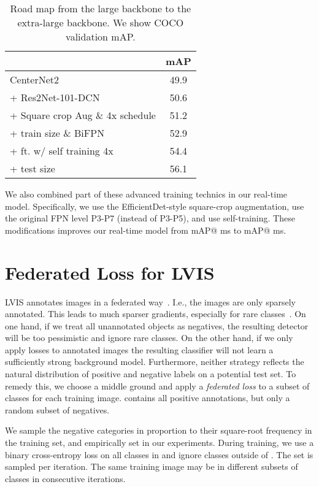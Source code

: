 \documentclass{article}
\begin{document}
\begin{table}[!t]
\centering
\begin{tabular}{l@{\ \ \ \ \ \ }c}
\toprule
 & mAP \\
\midrule
CenterNet2 & 49.9 \\
+ Res2Net-101-DCN & 50.6 \\
+ Square crop Aug \& 4x schedule & 51.2 \\
+ train size  \& BiFPN & 52.9 \\
+ ft. w/ self training 4x & 54.4 \\
+ test size  & 56.1 \\
\bottomrule
\end{tabular}
\vspace{-2mm}
\caption{Road map from the large backbone to the extra-large backbone. We show COCO validation mAP. }
\label{table:extralarge}
\vspace{-5mm}
\end{table}


We also combined part of these advanced training technics in our real-time model.
Specifically, we use the EfficientDet-style square-crop augmentation, use the original FPN level P3-P7 (instead of P3-P5), and use self-training.
These modifications improves our real-time model from mAP@ ms to  mAP@ ms.



\section{Federated Loss for LVIS}

LVIS annotates images in a federated way~\cite{gupta2019lvis}.
I.e., the images are only sparsely annotated.
This leads to much sparser gradients, especially for rare classes~\cite{tan2020eql}.
On one hand, if we treat all unannotated objects as negatives, the resulting detector will be too pessimistic and ignore rare classes.
On the other hand, if we only apply losses to annotated images the resulting classifier will not learn a sufficiently strong background model.
Furthermore, neither strategy reflects the natural distribution of positive and negative labels on a potential test set.
To remedy this, we choose a middle ground and apply a \emph{federated loss} to a subset  of classes for each training image.
 contains all positive annotations, but only a random subset of negatives.

We sample the negative categories in proportion to their square-root frequency in the training set, and empirically set  in our experiments.
During training, we use a binary cross-entropy loss on all classes in  and ignore classes outside of .
The set  is sampled per iteration.
The same training image may be in different subsets of classes in consecutive iterations.
\end{document}
